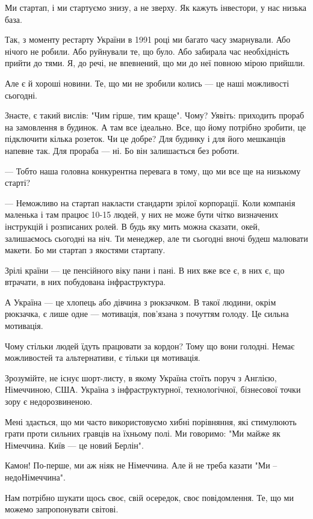 Ми стартап, і ми стартуємо знизу, а не зверху. Як кажуть інвестори, у нас
низька база.

Так, з моменту рестарту України в 1991 році ми багато часу змарнували. Або
нічого не робили. Або руйнували те, що було. Або забирала час необхідність
прийти до тями. Я, до речі, не впевнений, що ми до неї повною мірою прийшли.

Але є й хороші новини. Те, що ми не зробили колись --- це наші можливості
сьогодні. 

Знаєте, є такий вислів: "Чим гірше, тим краще". Чому? Уявіть: приходить прораб
на замовлення в будинок. А там все ідеально. Все, що йому потрібно зробити, це
підключити кілька розеток. Чи це добре? Для будинку і для його мешканців
напевне так. Для прораба --- ні. Бо він залишається без роботи.

--- Тобто наша головна конкурентна перевага в тому, що ми все ще на низькому
старті?

--- Неможливо на стартап накласти стандарти зрілої корпорації. Коли компанія
маленька і там працює 10-15 людей, у них не може бути чітко визначених
інструкцій і розписаних ролей. В будь яку мить можна сказати, окей, залишаємось
сьогодні на ніч. Ти менеджер, але ти сьогодні вночі будеш малювати макети. Бо
ми стартап з якостями стартапу.

Зрілі країни --- це пенсійного віку пани і пані. В них вже все є, в них є, що
втрачати, в них побудована інфраструктура.

А Україна --- це хлопець або дівчина з рюкзачком. В такої людини, окрім рюкзачка,
є лише одне --- мотивація, пов’язана з почуттям голоду. Це сильна мотивація. 

Чому стільки людей їдуть працювати за кордон? Тому що вони голодні. Немає
можливостей та альтернативи, є тільки ця мотивація.

Зрозумійте, не існує шорт-листу, в якому Україна стоїть поруч з Англією,
Німеччиною, США. Україна з інфраструктурної, технологічної, бізнесової точки
зору є недорозвиненою.

Мені здається, що ми часто використовуємо хибні порівняння, які стимулюють
грати проти сильних гравців на їхньому полі. Ми говоримо: "Ми майже як
Німеччина. Київ --- це новий Берлін".

Камон! По-перше, ми аж ніяк не Німеччина. Але й не треба казати "Ми –
недоНімеччина".

Нам потрібно шукати щось своє, свій осередок, своє повідомлення. Те, що ми
можемо запропонувати світові.

